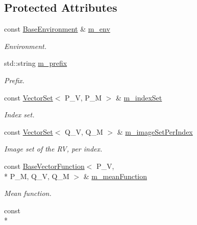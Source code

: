 \subsection*{Protected Attributes}
\begin{DoxyCompactItemize}
\item 
const \hyperlink{class_q_u_e_s_o_1_1_base_environment}{Base\-Environment} \& \hyperlink{class_q_u_e_s_o_1_1_vector_gaussian_random_field_ab4ad80cb336314fd0025abf0d37c5aa0}{m\-\_\-env}
\begin{DoxyCompactList}\small\item\em Environment. \end{DoxyCompactList}\item 
std\-::string \hyperlink{class_q_u_e_s_o_1_1_vector_gaussian_random_field_a1adeb7ad40609acaa8a5e47b19026e36}{m\-\_\-prefix}
\begin{DoxyCompactList}\small\item\em Prefix. \end{DoxyCompactList}\item 
const \hyperlink{class_q_u_e_s_o_1_1_vector_set}{Vector\-Set}$<$ P\-\_\-\-V, P\-\_\-\-M $>$ \& \hyperlink{class_q_u_e_s_o_1_1_vector_gaussian_random_field_a3b4453419ff7b6e593b2f6cc88830490}{m\-\_\-index\-Set}
\begin{DoxyCompactList}\small\item\em Index set. \end{DoxyCompactList}\item 
const \hyperlink{class_q_u_e_s_o_1_1_vector_set}{Vector\-Set}$<$ Q\-\_\-\-V, Q\-\_\-\-M $>$ \& \hyperlink{class_q_u_e_s_o_1_1_vector_gaussian_random_field_a6e1a9a6a3512559e1579e3c8a266141f}{m\-\_\-image\-Set\-Per\-Index}
\begin{DoxyCompactList}\small\item\em Image set of the R\-V, per index. \end{DoxyCompactList}\item 
const \hyperlink{class_q_u_e_s_o_1_1_base_vector_function}{Base\-Vector\-Function}$<$ P\-\_\-\-V, \\*
P\-\_\-\-M, Q\-\_\-\-V, Q\-\_\-\-M $>$ \& \hyperlink{class_q_u_e_s_o_1_1_vector_gaussian_random_field_a648031ddf7e3d5d4d0eb353edc52b4bc}{m\-\_\-mean\-Function}
\begin{DoxyCompactList}\small\item\em Mean function. \end{DoxyCompactList}\item 
const \\*

\end{DoxyCompactItemize}
